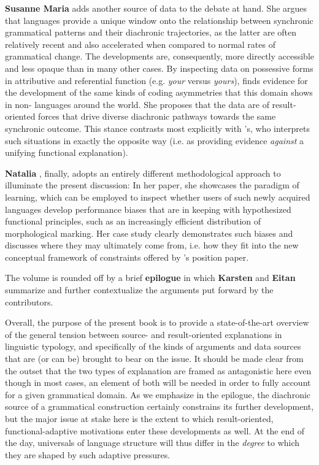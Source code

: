 \documentclass[output=paper]{langsci/langscibook}
\begin{document}
\textbf{Susanne Maria } adds another source of data to the debate at hand. She argues that  languages provide a unique window onto the relationship between synchronic grammatical patterns and their diachronic trajectories, as the latter are often relatively recent and also accelerated when compared to normal rates of grammatical change. The developments are, consequently, more directly accessible and less opaque than in many other cases. By inspecting  data on possessive forms in attributive and referential function (e.g. \textit{your} versus \textit{yours}),  finds evidence for the development of the same kinds of coding asymmetries that this domain shows in non- languages around the world. She proposes that the data are  of result-oriented forces that drive diverse diachronic pathways towards the same synchronic outcome. This stance contrasts most explicitly with ’s, who interprets such situations in exactly the opposite way (i.e. as providing evidence \textit{against} a unifying functional explanation).

\textbf{Natalia }, finally, adopts an entirely different methodological approach to illuminate the present discussion: In her paper, she showcases the paradigm of  learning, which can be employed to inspect whether users of such newly acquired languages develop performance biases that are in keeping with hypothesized functional principles, such as an increasingly efficient distribution of morphological marking. Her case study clearly demonstrates such biases and discusses where they may ultimately come from, i.e. how they fit into the new conceptual framework of constraints offered by ’s position paper.
\largerpage

The volume is rounded off by a brief \textbf{epilogue} in which \textbf{Karsten } and \textbf{Eitan } summarize and further contextualize the arguments put forward by the contributors. 

Overall, the purpose of the present book is to provide a state-of-the-art overview of the general tension between source- and result-oriented explanations in linguistic typology, and specifically of the kinds of arguments and data sources that are (or can be) brought to bear on the issue. It should be made clear from the outset that the two types of explanation are framed as antagonistic here even though in most cases, an element of both will be needed in order to fully account for a given grammatical domain. As we emphasize in the epilogue, the diachronic source of a grammatical construction certainly constrains its further development, but the major issue at stake here is the extent to which result-oriented, functional-adaptive motivations enter these developments as well. At the end of the day, universals of language structure will thus differ in the \textit{degree} to which they are shaped by such adaptive pressures.
\end{document}
